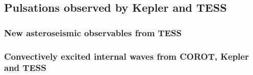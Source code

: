 {\color{blue}
\subsection{Pulsations observed by Kepler and TESS}


\subsubsection{New asteroseismic observables from TESS}

\subsubsection{Convectively excited internal waves from COROT, Kepler and TESS}


}